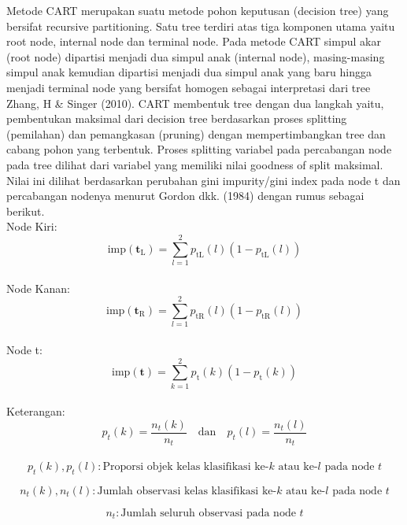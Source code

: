 Metode CART merupakan suatu metode pohon keputusan (decision tree) yang bersifat recursive partitioning. Satu tree terdiri atas tiga komponen utama yaitu root node, internal node dan terminal node. Pada metode CART simpul akar (root node) dipartisi menjadi dua simpul anak (internal node), masing-masing simpul anak kemudian dipartisi menjadi dua simpul anak yang baru hingga menjadi terminal node yang bersifat homogen sebagai interpretasi dari tree Zhang, H \& Singer (2010). CART membentuk tree dengan dua langkah yaitu, pembentukan maksimal dari decision tree berdasarkan proses splitting (pemilahan) dan pemangkasan (pruning) dengan mempertimbangkan tree dan cabang pohon yang terbentuk. Proses splitting variabel pada percabangan node pada tree dilihat dari variabel yang memiliki nilai goodness of split maksimal. Nilai ini dilihat berdasarkan perubahan gini impurity/gini index pada node t dan percabangan nodenya menurut Gordon dkk. (1984) dengan rumus sebagai berikut.
\\
Node Kiri:
\begin{equation}
    \text{imp}(\mathbf{t}_{\text{L}}) = \sum_{l=1}^{2} p_{\text{tL}}(l)(1 - p_{\text{tL}}(l))
\end{equation}
\\
Node Kanan:
\begin{equation}
    \text{imp}(\mathbf{t}_{\text{R}}) = \sum_{l=1}^{2} p_{\text{tR}}(l)(1 - p_{\text{tR}}(l))
    \end{equation}
\\ 
Node t:
\begin{equation}
    \text{imp}(\mathbf{t}) = \sum_{k=1}^{2} p_{\text{t}}(k)(1 - p_{\text{t}}(k))
    \end{equation}
\\
Keterangan:
\begin{equation}
    p_{t}(k) = \frac{n_{t}(k)}{n_{t}} \quad \text{dan} \quad p_{t}(l) = \frac{n_{t}(l)}{n_{t}}
    \end{equation}
\\
\begin{equation}
    p_{t}(k), p_{t}(l) : \text{Proporsi objek kelas klasifikasi ke-} k \text{ atau ke-} l \text{ pada node } t
    \end{equation}
    
    \begin{equation}
    n_{t}(k), n_{t}(l) : \text{Jumlah observasi kelas klasifikasi ke-} k \text{ atau ke-} l \text{ pada node } t
    \end{equation}
    
    \begin{equation}
    n_{t} : \text{Jumlah seluruh observasi pada node } t
    \end{equation}